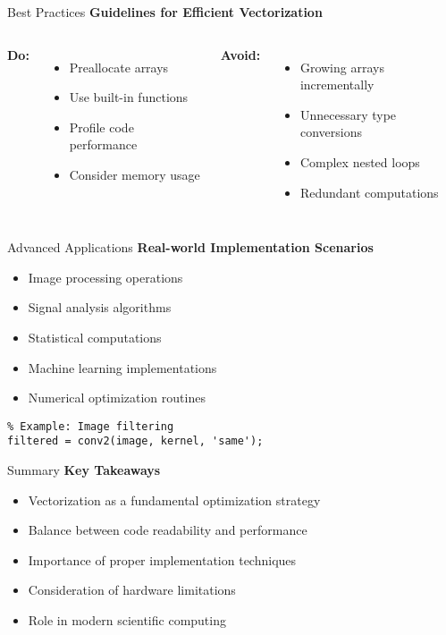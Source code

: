 \documentclass[10pt]{beamer}
\theoremstyle{plain}%
\theoremstyle{definition}
\theoremstyle{remark}
\begin{document}
\begin{frame}[fragile]{Best Practices}
  \textbf{Guidelines for Efficient Vectorization}
  \begin{columns}
      \textbf{Do:}
      \begin{itemize}
          \item Preallocate arrays
          \item Use built-in functions
          \item Profile code performance
          \item Consider memory usage
      \end{itemize}
      
      \textbf{Avoid:}
          \begin{itemize}
              \item Growing arrays incrementally
              \item Unnecessary type conversions
              \item Complex nested loops
              \item Redundant computations
          \end{itemize}
  \end{columns}
\end{frame}

\begin{frame}[fragile]{Advanced Applications}
  \textbf{Real-world Implementation Scenarios}
  \begin{itemize}
      \item Image processing operations
      \item Signal analysis algorithms
      \item Statistical computations
      \item Machine learning implementations
      \item Numerical optimization routines
  \end{itemize}
  \begin{lstlisting}
% Example: Image filtering
filtered = conv2(image, kernel, 'same');
  \end{lstlisting}
\end{frame}

\begin{frame}[fragile]{Summary}
  \textbf{Key Takeaways}
  \begin{itemize}
      \item Vectorization as a fundamental optimization strategy
      \item Balance between code readability and performance
      \item Importance of proper implementation techniques
      \item Consideration of hardware limitations
      \item Role in modern scientific computing
  \end{itemize}
\end{frame}
\end{document}

